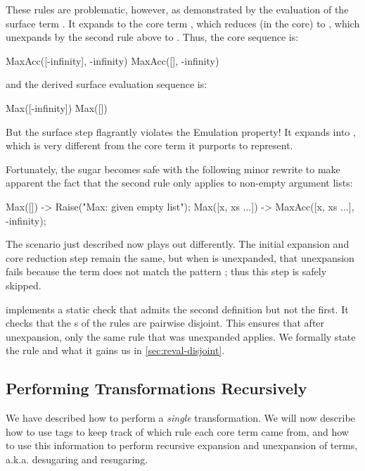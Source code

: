 These rules are problematic, however, as demonstrated by the evaluation of
the surface term . It expands to the core term
, which reduces (in the core)
to , which unexpands by the second rule above to
. Thus, the core sequence is:
\begin{Codes}
    MaxAcc([-infinity], -infinity)
\CoreStep MaxAcc([], -infinity)
\end{Codes}
and the derived surface evaluation sequence is:
\begin{Codes}
    Max([-infinity])
\SurfStep Max([])
\end{Codes}

But the  surface step flagrantly violates the Emulation
property! It expands into , which is very
different from the core term  it purports to
represent.

Fortunately, the  sugar becomes safe with the following minor
rewrite to make apparent the fact that the second rule only applies to
non-empty argument lists:
\begin{Codes}
Max([]) -> Raise("Max: given empty list");
Max([x, xs ...]) -> MaxAcc([x, xs ...], -infinity);
\end{Codes}
The scenario just described now plays out differently. The initial
expansion and core reduction step remain the same, but when
 is unexpanded, that unexpansion fails because
the term does not match the  pattern ; thus this step is safely skipped.

{\Resugarer} implements a static check that admits the second definition
but not the first. It checks that the s of the rules are pairwise
disjoint. This
ensures that after unexpansion, only the same rule that was unexpanded
applies. We formally state the rule and what it gains us in
\cref{sec:reval-disjoint}.

\subsection{Performing Transformations Recursively}
\label{sec:reval-manyrule}

We have described how to perform a \emph{single} transformation. We will now
describe how to use tags to keep track of which rule each core term came
from, and how to use this information to perform recursive expansion and
unexpansion of terms, a.k.a. desugaring and resugaring.

